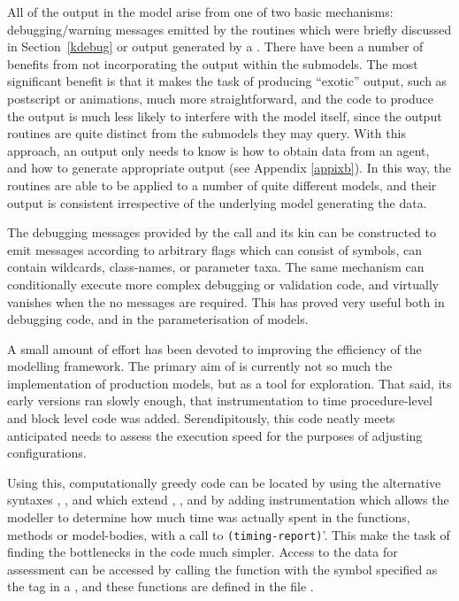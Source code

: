 All of the output in the model arise from one of two basic mechanisms:
debugging/warning messages emitted by the  routines
which were briefly discussed in Section~\ref{kdebug} or output
generated by a \mlogger.  There have been a number of benefits from
not incorporating the output within the submodels.  The most
significant benefit is that it makes the task of producing ``exotic''
output, such as postscript or animations, much more straightforward,
and the code to produce the output is much less likely to interfere
with the model itself, since the output routines are quite distinct
from the submodels they may query.  With this approach, an output only
needs to know is how to obtain data from an agent, and how to generate
appropriate output (see
Appendix \ref{appixb}). In this way, the  routines are
able to be applied to a number of quite different models, and their
output is consistent irrespective of the underlying model generating
the data.

The debugging messages provided by the  call and its
kin can be constructed to emit messages according to arbitrary flags
which can consist of symbols, can contain wildcards, class-names, or
parameter taxa.  The same mechanism can conditionally execute more
complex debugging or validation code, and virtually vanishes when the
no messages are required.  This has proved very useful both in
debugging code, and in the parameterisation of models.

A small amount of effort has been devoted to improving the efficiency
of the modelling framework.  The primary aim of \ReModel is currently
not so much the implementation of production models, but as a tool for
exploration.  That said, its early versions ran slowly enough, that
instrumentation to time procedure-level and block level code was
added.  Serendipitously, this code neatly meets anticipated needs to
assess the execution speed for the purposes of adjusting
configurations.

Using this, computationally greedy code can be located by using the
alternative syntaxes , ,
and  which extend 
, ,
and  by adding instrumentation which allows the
modeller to determine how much time was actually spent in the
functions, methods or model-bodies, with a call
to \texttt{(timing-report)}'. This make the task of finding the
bottlenecks in the code much simpler.  Access to the data for
assessment can be accessed by calling the
function  with the symbol specified as the tag in
a , and these functions are defined in the
file .

